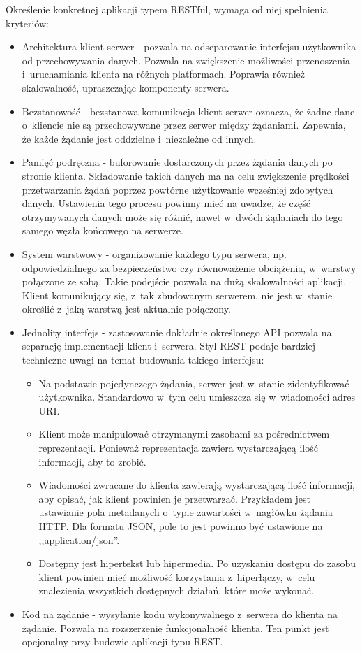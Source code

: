 Określenie konkretnej aplikacji typem RESTful\cite{restapibook}, wymaga od niej spełnienia kryteriów:
\begin{itemize}
    \item Architektura klient serwer - pozwala na odseparowanie interfejsu użytkownika od przechowywania danych. Pozwala na zwiększenie możliwości przenoszenia i~uruchamiania klienta na różnych platformach. Poprawia również skalowalność, upraszczając komponenty serwera.
    \item Bezstanowość - bezstanowa komunikacja klient-serwer oznacza, że żadne dane o~kliencie nie są przechowywane przez serwer między żądaniami. Zapewnia, że każde żądanie jest oddzielne i~niezależne od innych.
    \item Pamięć podręczna - buforowanie dostarczonych przez żądania danych po stronie klienta. Składowanie takich danych ma na celu zwiększenie prędkości przetwarzania żądań poprzez powtórne użytkowanie wcześniej zdobytych danych. Ustawienia tego procesu powinny mieć na uwadze, że część otrzymywanych danych może się różnić, nawet w~dwóch żądaniach do tego samego węzła końcowego na serwerze.
    \item System warstwowy - organizowanie każdego typu serwera, np. odpowiedzialnego za bezpieczeństwo czy równoważenie obciążenia, w~warstwy połączone ze sobą. Takie podejście pozwala na dużą skalowalności aplikacji. Klient komunikujący się, z~tak zbudowanym serwerem, nie jest w~stanie określić z~jaką warstwą jest aktualnie połączony.
    \item Jednolity interfejs - zastosowanie dokładnie określonego API pozwala na separację implementacji klient i~serwera. Styl REST podaje bardziej techniczne uwagi na temat budowania takiego interfejsu:
    \begin{itemize}
        \item Na podstawie pojedynczego żądania, serwer jest w~stanie zidentyfikować użytkownika. Standardowo w~tym celu umieszcza się w~wiadomości adres URI.
        \item Klient może manipulować otrzymanymi zasobami za pośrednictwem reprezentacji. Ponieważ reprezentacja zawiera wystarczającą ilość informacji, aby to zrobić.
        \item Wiadomości zwracane do klienta zawierają wystarczającą ilość informacji, aby opisać, jak klient powinien je przetwarzać. Przykładem jest ustawianie pola metadanych o~typie zawartości w~nagłówku żądania HTTP. Dla formatu JSON, pole to jest powinno być ustawione na 	,,application/json''.
        \item Dostępny jest hipertekst lub hipermedia. Po uzyskaniu dostępu do zasobu klient powinien mieć możliwość korzystania z~hiperłączy, w~celu znalezienia wszystkich dostępnych działań, które może wykonać. 
    \end{itemize}
    \item Kod na żądanie - wysyłanie kodu wykonywalnego z~serwera do klienta na żądanie. Pozwala na rozszerzenie funkcjonalność klienta. Ten punkt jest opcjonalny przy budowie aplikacji typu REST.
\end{itemize}


